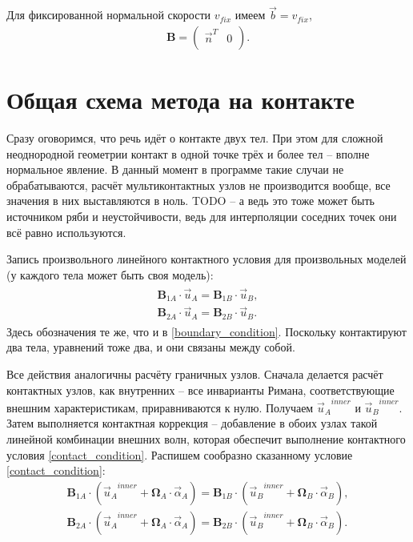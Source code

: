 Для фиксированной нормальной скорости $v_{fix}$ имеем $\vec{b} = v_{fix}$,
\begin{align}
\label{fixed_normal_velocity_acoustic}
	\mathbf{B} =
	\left( \begin{array}{cccccccccccc}
	 \vec{n}^T & 0 \\
	\end{array} \right).
\end{align}


\section{Общая схема метода на контакте}
Сразу оговоримся, что речь идёт о контакте двух тел. При этом для сложной неоднородной геометрии контакт в одной точке трёх и более тел -- вполне нормальное явление. В данный момент в программе такие случаи не обрабатываются, расчёт мультиконтактных узлов не производится вообще, все значения в них выставляются в ноль. TODO -- а ведь это тоже может быть источником ряби и неустойчивости, ведь для интерполяции соседних точек они всё равно используются.

Запись произвольного линейного контактного условия для произвольных моделей (у каждого тела может быть своя модель):
\begin{eqnarray}
\label{contact_condition}
\begin{split}
	\mathbf{B}_{1A} \cdot \vec{u}_A = \mathbf{B}_{1B} \cdot \vec{u}_B, \\
	\mathbf{B}_{2A} \cdot \vec{u}_A = \mathbf{B}_{2B} \cdot \vec{u}_B.
\end{split}
\end{eqnarray}
Здесь обозначения те же, что и в \eqref{boundary_condition}. Поскольку контактируют два тела, уравнений тоже два, и они связаны между собой.

Все действия аналогичны расчёту граничных узлов. Сначала делается расчёт контактных узлов, как внутренних -- все инварианты Римана, соответствующие внешним характеристикам, приравниваются к нулю. Получаем ${\vec{u}_A}^{inner}$ и ${\vec{u}_B}^{inner}$. Затем выполняется контактная коррекция -- добавление в обоих узлах такой линейной комбинации внешних волн, которая обеспечит выполнение контактного условия \eqref{contact_condition}. Распишем сообразно сказанному условие \eqref{contact_condition}:
\begin{eqnarray}
	\mathbf{B}_{1A} \cdot ({\vec{u}_A}^{inner} + \mathbf{\Omega}_A \cdot \vec{\alpha}_A) = \mathbf{B}_{1B} \cdot ({\vec{u}_B}^{inner} + \mathbf{\Omega}_B \cdot \vec{\alpha}_B), \\
\label{second_line_in_contact_condition_wide}
	\mathbf{B}_{2A} \cdot ({\vec{u}_A}^{inner} + \mathbf{\Omega}_A \cdot \vec{\alpha}_A) = \mathbf{B}_{2B} \cdot ({\vec{u}_B}^{inner} + \mathbf{\Omega}_B \cdot \vec{\alpha}_B).
\end{eqnarray}

